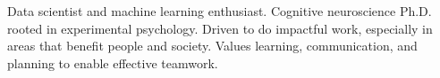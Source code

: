 
\begin{cvparagraph}

Data scientist and machine learning enthusiast. Cognitive neuroscience Ph.D. rooted in experimental psychology. Driven to do impactful work, especially in areas that benefit people and society. Values learning, communication, and planning to enable effective teamwork.

\end{cvparagraph}
